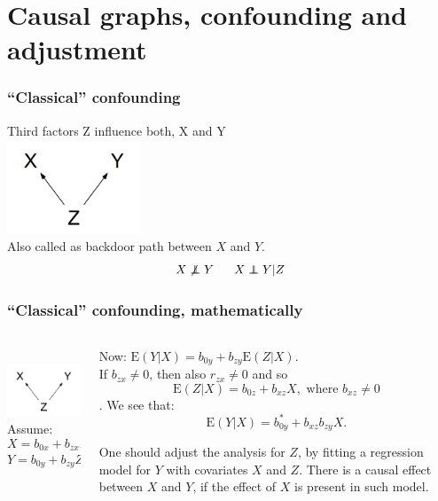\documentclass[10pt,dvipsnames,t,handout%
,aspectratio=169%
]{beamer}%
\newcommand{\E}{\mathrm{E}}
\newcommand{\indep}{\perp\!\!\!\!\perp}
\begin{document}
\section{Causal graphs, confounding and adjustment}


\begin{frame}
	\frametitle{``Classical'' confounding}
	Third factors  Z influence both, X and Y \\
	\includegraphics[width=4cm]{conf1}\\
	Also called as \alert{backdoor path} between $X$ and $Y$. \\
	
$$X \not\indep Y \; \hspace{0.5cm}  X \indep Y|Z$$
	
\end{frame}

\begin{frame}
	\frametitle{``Classical'' confounding, mathematically}
\begin{columns}
\begin{column}{5cm}
\mbox{ } \\
	\includegraphics[width=4cm]{conf1}
	\mbox{}\\[0.5cm]
Assume:
$$X= b_{0x} + b_{zx}Z + \varepsilon_x, \ \E(\varepsilon_x|Z)=0 $$  
$$ Y= b_{0y} + b_{zy}Z + \varepsilon_y, \ \E(\varepsilon_y|Z, X)=0. $$
\end{column}
\begin{column}{7cm}
Now: 
$\E(Y|X) = b_{0y} + b_{zy}\E(Z|X). $ \\[0.2cm]
If  $b_{zx} \ne 0$, then also  $r_{zx} \ne 0$ and so 
$$ \E(Z|X) =  b_{0z}+ b_{xz}X, \mbox{ where }b_{xz} \ne 0$$. 
We see that:
$$\E(Y|X) = b_{0y}^* + b_{xz}b_{zy}X. $$

\begin{block}{}\alert{One should adjust the analysis for $Z$, by fitting a regression model for $Y$ with covariates
	$X$  and $Z$.} 
There is a causal effect between $X$ and $Y$, if the effect of $X$ is present in such model. \end{block}
\end{column}
\end{columns}
\end{frame}
\end{document}
